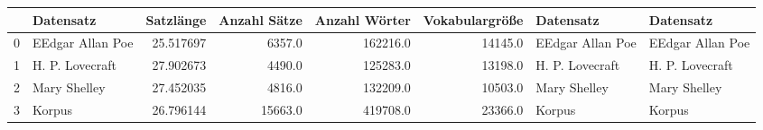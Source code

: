 \begin{tabular}{llrrrrll}
\toprule
{} &         Datensatz &  Satzlänge &  Anzahl Sätze &  Anzahl Wörter &  Vokabulargröße &         Datensatz &         Datensatz \\
\midrule
0 &  EEdgar Allan Poe &  25.517697 &        6357.0 &       162216.0 &         14145.0 &  EEdgar Allan Poe &  EEdgar Allan Poe \\
1 &   H. P. Lovecraft &  27.902673 &        4490.0 &       125283.0 &         13198.0 &   H. P. Lovecraft &   H. P. Lovecraft \\
2 &      Mary Shelley &  27.452035 &        4816.0 &       132209.0 &         10503.0 &      Mary Shelley &      Mary Shelley \\
3 &            Korpus &  26.796144 &       15663.0 &       419708.0 &         23366.0 &            Korpus &            Korpus \\
\bottomrule
\end{tabular}
